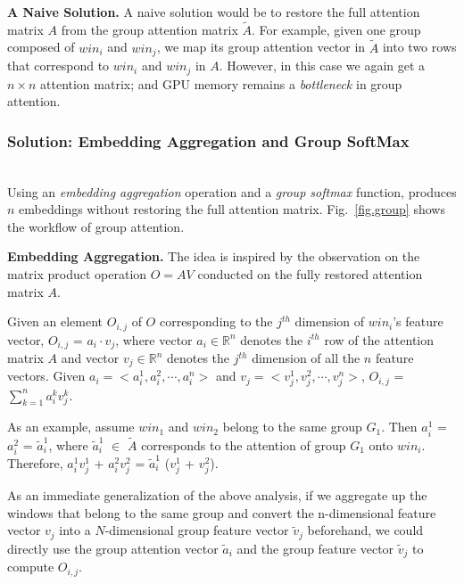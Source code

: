 \begin{sloppypar}
\noindent\textbf{A Naive Solution.} A naive solution would be to restore the full attention matrix $A$ from the group attention matrix $\widetilde{A}$. For example, given one group composed of $win_i$ and $win_j$, we map its group attention vector in  $\widetilde{A}$ into two rows that correspond to $win_i$ and $win_j$ in $A$. 
However, in this case we again get a $n \times n$ attention matrix; and GPU memory remains a {\it bottleneck} in group attention.

\vspace{-1mm}
\subsubsection{Solution: Embedding Aggregation and Group SoftMax\nopunct}\ \\
\label{sec.group.efficient}
Using an \textit{embedding aggregation} operation and a \textit{group softmax} function, \system produces $n$ embeddings without restoring the full attention matrix. Fig.~\ref{fig.group} shows the workflow of group attention. 

\noindent\textbf{Embedding Aggregation.} The idea is inspired by the observation on the matrix product operation $\mathit{O = AV}$ conducted on the fully restored attention matrix $A$. 

Given an element $O_{i,j}$ of $O$ corresponding to the $j^{th}$ dimension of $win_i$'s feature vector, $O_{i,j}$ = $a_i \cdot v_j$, where vector $\mathit{a_i \in \mathbb{R}^{n}}$ denotes the $i^{th}$ row of the attention matrix $A$ and vector $\mathit{v_j \in \mathbb{R}^{n}}$ denotes the $j^{th}$ dimension of all the $n$ feature vectors. 
Given $\mathit{a_i = <a_i^1, a_i^2, \cdots, a_i^n>}$ and $\mathit{v_j = <v_j^1, v_j^2, \cdots, v_j^n>}$, $O_{i,j}$ = $\mathit{\sum_{k=1}^n a_i^k v_j^k}$.

As an example, assume $win_1$ and $win_2$ belong to the same group $G_1$. Then $a_i^1$ = $a_i^2$ = $\widetilde{a}_i^1$, where $\widetilde{a}_i^1$ $\in$ $\widetilde{A}$ corresponds to the attention of group $G_1$ onto $win_i$. 
Therefore, $a_i^1 v_j^1$ + $a_i^2 v_j^2$ = $\widetilde{a}_i^1$ ($v_j^1$ + $v_j^2$).

As an immediate generalization of the above analysis, if we aggregate up the windows that belong to the same group and convert the n-dimensional feature vector $v_j$ into a $N$-dimensional group feature vector $\widetilde{v}_j$ beforehand, we could directly use the group attention vector $\widetilde{a}_i$ and the group feature vector $\widetilde{v}_j$ to compute $O_{i,j}$.


\end{sloppypar}

